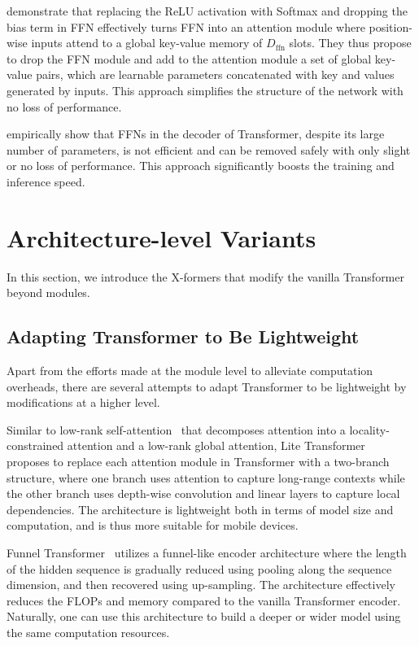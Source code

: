 \documentclass[manuscript,acmsmall,screen,nonacm]{acmart}
\theoremstyle{definition}
\begin{document}
\citet{sukhbaatar2019augmenting} demonstrate that replacing the ReLU activation with Softmax and dropping the bias term in FFN effectively turns FFN into an attention module where position-wise inputs attend to a global key-value memory of $D_{\mathrm{ffn}}$ slots. They thus propose to drop the FFN module and add to the attention module a set of global key-value pairs, which are learnable parameters concatenated with key and values generated by inputs. This approach simplifies the structure of the network with no loss of performance.

\citet{yang20xformerdec} empirically show that FFNs in the decoder of Transformer, despite its large number of parameters, is not efficient and can be removed safely with only slight or no loss of performance. This approach significantly boosts the training and inference speed.

\section{Architecture-level Variants}\label{sec:beyond}

In this section, we introduce the X-formers that modify the vanilla Transformer beyond modules.

\subsection{Adapting Transformer to Be Lightweight}

Apart from the efforts made at the module level to alleviate computation overheads, there are several attempts to adapt Transformer to be lightweight by modifications at a higher level.

Similar to low-rank self-attention~\cite{guo19lowrank} that decomposes attention into a locality-constrained attention and a low-rank global attention, Lite Transformer~\cite{wu20longshortrange} proposes to replace each attention module in Transformer with a two-branch structure, where one branch uses attention to capture long-range contexts while the other branch uses depth-wise convolution and linear layers to capture local dependencies. The architecture is lightweight both in terms of model size and computation, and is thus more suitable for mobile devices.

Funnel Transformer~\cite{dai20funneltransformer} utilizes a funnel-like encoder architecture where the length of the hidden sequence is gradually reduced using pooling along the sequence dimension, and then recovered using up-sampling. The architecture effectively reduces the FLOPs and memory compared to the vanilla Transformer encoder. Naturally, one can use this architecture to build a deeper or wider model using the same computation resources.
\end{document}
